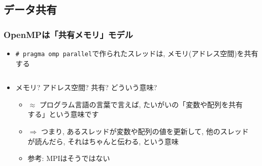 \documentclass[10pt,dvipdfmx]{beamer}
\newcommand{\ao}[1]{{\color{blue}#1}}
\newcommand{\aka}[1]{{\color{red}#1}}
\begin{document}
\iffalse
\begin{frame}[fragile]
\frametitle{Parallelizing loop nests by \ao{\tt collapse}}
\begin{itemize}
\item \ao{\tt collapse($l$)} can be used to partition nested loops. e.g.,
\begin{lstlisting}
#pragma omp for @\ao{collapse(2)}@
for (i = 0; i < n; i++)
  for (j = 0; j < n; j++)
    @$S$@
\end{lstlisting}
will partition $n^2$ iterations of the doubly-nested loop
\item {\tt schedule} clause applies to nested loops as if 
  the nested loop is an equivalent flat loop
\item restriction: the loop must be \ao{\em ``perfectly nested''}
  (the iteration space must be a rectangular and no intervening
  statement between different levels of the nest)
\end{itemize}
\end{frame}
\fi

\subsection{データ共有}

\begin{frame}
\frametitle{OpenMPは「共有メモリ」モデル}
\begin{itemize}
\item \texttt{\# pragma omp parallel}で作られたスレッドは,
  \ao{メモリ(アドレス空間)を共有}する
\end{itemize}

\begin{columns}
  \begin{column}{0.6\textwidth}
    \begin{itemize}
    \item<2-> メモリ? アドレス空間? 共有? どういう意味?
      \begin{itemize}
      \item<3-> $\approx$ プログラム言語の言葉で言えば,
        \aka{たいがいの}「変数や配列を共有する」という意味です
      \item<4-> $\Rightarrow$ つまり, あるスレッドが変数や配列の値を更新して,
        他のスレッドが読んだら, それはちゃんと伝わる, という意味
      \item<5-> 参考: MPIはそうではない
      \end{itemize}
    \end{itemize}
  \end{column}
  \begin{column}{0.4\textwidth}
  \begin{center}
  \end{center}
  \end{column}
\end{columns}
\end{frame}
\end{document}

